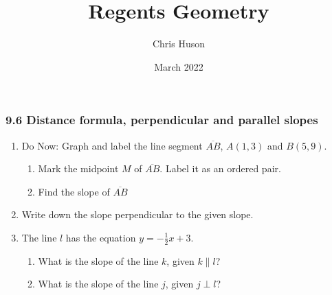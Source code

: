 \documentclass[12pt, twoside]{article}
\title{Regents Geometry}
\author{Chris Huson}
\date{March 2022}
\begin{document}
\subsubsection*{9.6 Distance formula, perpendicular and parallel slopes}
\begin{enumerate}
\item Do Now: Graph and label the line segment $\overline{AB}$, $A(1,3)$ and $B(5,9)$.
  \begin{multicols}{2}
    \begin{enumerate}
    \item Mark the midpoint $M$ of $\overline{AB}$. Label it as an ordered pair.  \vspace{1cm} 
    \item Find the slope of $\overline{AB}$
  \end{enumerate} \vspace{1cm}  
  \begin{center} %
    \end{center} 
  \end{multicols}

\item Write down the slope perpendicular to the given slope.
\begin{enumerate}
\end{enumerate} \vspace{1cm}

\item The line $l$ has the equation $y=-\frac{1}{2} x+3$.
\begin{enumerate}
  \item What is the slope of the line $k$, given $k \parallel l$?
  \vspace{1.3cm}
  \item What is the slope of the line $j$, given $j \perp l$?
  \vspace{1.3cm}
\end{enumerate}


\end{enumerate}
\end{document}
